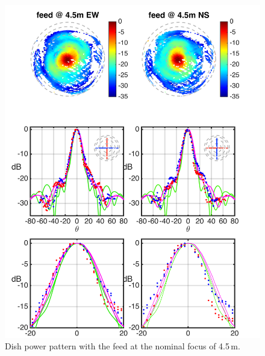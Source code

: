 \documentclass[preprint]{aastex}
\begin{document}
\begin{figure}[h]
\includegraphics[width=6.5in]{dish1_abs_old_ref_model.png}
\caption{Dish power pattern with the feed at the nominal focus of 4.5\,m.}
\label{fig:dish1}
\end{figure}
\end{document}
